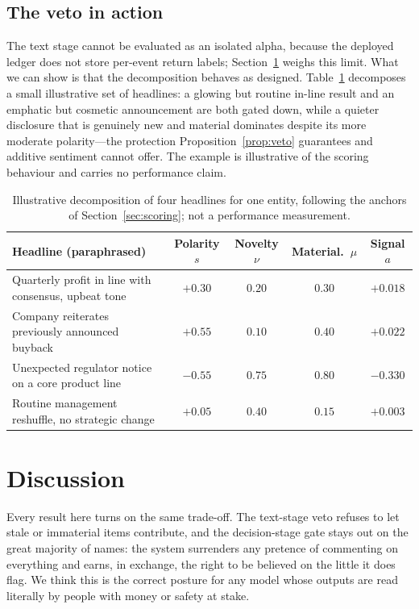 \documentclass{elektr}
\begin{document}
\subsection{The veto in action}
\label{sec:vetoaction}
The text stage cannot be evaluated as an isolated alpha, because the deployed ledger does not store per-event return labels; Section~\ref{sec:discussion} weighs this limit. What we can show is that the decomposition behaves as designed. Table~\ref{tab:example} decomposes a small illustrative set of headlines: a glowing but routine in-line result and an emphatic but cosmetic announcement are both gated down, while a quieter disclosure that is genuinely new and material dominates despite its more moderate polarity---the protection Proposition~\ref{prop:veto} guarantees and additive sentiment cannot offer. The example is illustrative of the scoring behaviour and carries no performance claim.

\begin{table}[h!]
\caption{Illustrative decomposition of four headlines for one entity, following the anchors of Section~\ref{sec:scoring}; not a performance measurement.}
\begin{center}
\begin{tabular}{p{6.6cm}cccc}
\toprule
Headline (paraphrased) & Polarity $s$ & Novelty $\nu$ & Material.\ $\mu$ & Signal $a$ \\
\midrule
Quarterly profit in line with consensus, upbeat tone & $+0.30$ & $0.20$ & $0.30$ & $+0.018$ \\
Company reiterates previously announced buyback & $+0.55$ & $0.10$ & $0.40$ & $+0.022$ \\
Unexpected regulator notice on a core product line & $-0.55$ & $0.75$ & $0.80$ & $-0.330$ \\
Routine management reshuffle, no strategic change & $+0.05$ & $0.40$ & $0.15$ & $+0.003$ \\
\bottomrule
\end{tabular}
\label{tab:example}
\end{center}\vs{-6mm}
\end{table}

\section{Discussion}
\label{sec:discussion}
Every result here turns on the same trade-off. The text-stage veto refuses to let stale or immaterial items contribute, and the decision-stage gate stays out on the great majority of names: the system surrenders any pretence of commenting on everything and earns, in exchange, the right to be believed on the little it does flag. We think this is the correct posture for any model whose outputs are read literally by people with money or safety at stake.
\end{document}
